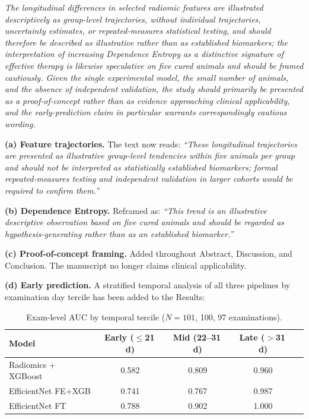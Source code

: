 \documentclass[12pt]{article}
\newcommand{\rc}[1]{\begin{reviewerbox}\itshape #1\end{reviewerbox}}
\begin{document}
\rc{The longitudinal differences in selected radiomic features are illustrated descriptively as group-level trajectories, without individual trajectories, uncertainty estimates, or repeated-measures statistical testing, and should therefore be described as illustrative rather than as established biomarkers; the interpretation of increasing Dependence Entropy as a distinctive signature of effective therapy is likewise speculative on five cured animals and should be framed cautiously. Given the single experimental model, the small number of animals, and the absence of independent validation, the study should primarily be presented as a proof-of-concept rather than as evidence approaching clinical applicability, and the early-prediction claim in particular warrants correspondingly cautious wording.}

\textbf{(a) Feature trajectories.} The text now reads: \textit{``These longitudinal trajectories are presented as illustrative group-level tendencies within five animals per group and should not be interpreted as statistically established biomarkers; formal repeated-measures testing and independent validation in larger cohorts would be required to confirm them.''}

\textbf{(b) Dependence Entropy.} Reframed as: \textit{``This trend is an illustrative descriptive observation based on five cured animals and should be regarded as hypothesis-generating rather than as an established biomarker.''}

\textbf{(c) Proof-of-concept framing.} Added throughout Abstract, Discussion, and Conclusion. The manuscript no longer claims clinical applicability.

\textbf{(d) Early prediction.} A stratified temporal analysis of all three pipelines by examination day tercile has been added to the Results:

\begin{table}[h]
\centering\small
\begin{tabular}{lcccc}
\toprule
Model & Early ($\leq$21\,d) & Mid (22--31\,d) & Late ($>$31\,d) \\
\midrule
Radiomics + XGBoost & 0.582 & 0.809 & 0.960 \\
EfficientNet FE+XGB & 0.741 & 0.767 & 0.987 \\
EfficientNet FT      & 0.788 & 0.902 & 1.000 \\
\bottomrule
\end{tabular}
\caption*{Exam-level AUC by temporal tercile ($N=101$, 100, 97 examinations).}
\end{table}
\end{document}
